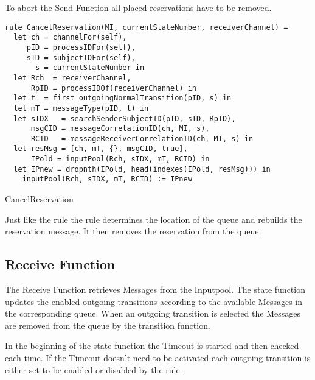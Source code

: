 To abort the Send Function all placed reservations have to be removed.


\begin{listing}[H]
\begin{verbatim}
rule CancelReservation(MI, currentStateNumber, receiverChannel) =
  let ch = channelFor(self),
     pID = processIDFor(self),
     sID = subjectIDFor(self),
       s = currentStateNumber in
  let Rch  = receiverChannel,
      RpID = processIDOf(receiverChannel) in
  let t  = first_outgoingNormalTransition(pID, s) in
  let mT = messageType(pID, t) in
  let sIDX   = searchSenderSubjectID(pID, sID, RpID),
      msgCID = messageCorrelationID(ch, MI, s),
      RCID   = messageReceiverCorrelationID(ch, MI, s) in
  let resMsg = [ch, mT, {}, msgCID, true],
      IPold = inputPool(Rch, sIDX, mT, RCID) in
  let IPnew = dropnth(IPold, head(indexes(IPold, resMsg))) in
    inputPool(Rch, sIDX, mT, RCID) := IPnew
\end{verbatim}
\caption{CancelReservation}
\label{lst:shortasm:CancelReservation}
\end{listing}


Just like the  rule the
 rule determines the location of the queue and
rebuilds the reservation message. It then removes the reservation from the
queue.


\subsection{Receive Function}


The Receive Function retrieves Messages from the Inputpool. The state function
updates the enabled outgoing transitions according to the available Messages in
the corresponding queue. When an outgoing transition is selected the Messages
are removed from the queue by the transition function.


In the beginning of the state function the Timeout is started and then checked
each time.
If the Timeout doesn't need to be activated each outgoing transition is either set to
be enabled or disabled by the  rule.



